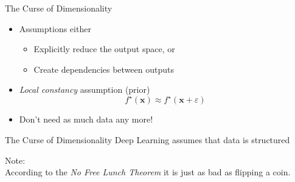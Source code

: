 \begin{slide}{The Curse of Dimensionality}
  \begin{itemize}
    \item<1-> Assumptions either
    \begin{itemize}
      \item<2-> Explicitly reduce the output space, or
      \item<3-> Create dependencies between outputs
    \end{itemize}
    \item<4-> \emph{Local constancy} assumption (prior) $$f^\star(\mathbf{x})
     \approx f^\star(\mathbf{x} + \varepsilon)$$
    \item<7-> Don't need as much data any more!
  \end{itemize}
\end{slide}

\begin{slide}{The Curse of Dimensionality}
  {\Large
    Deep Learning assumes that data is structured\\

  }
  \vspace{1cm}

   {
    \footnotesize
    Note:\\
    According to the \emph{No Free Lunch Theorem} it is just as bad as flipping a coin.
  }
\end{slide}

